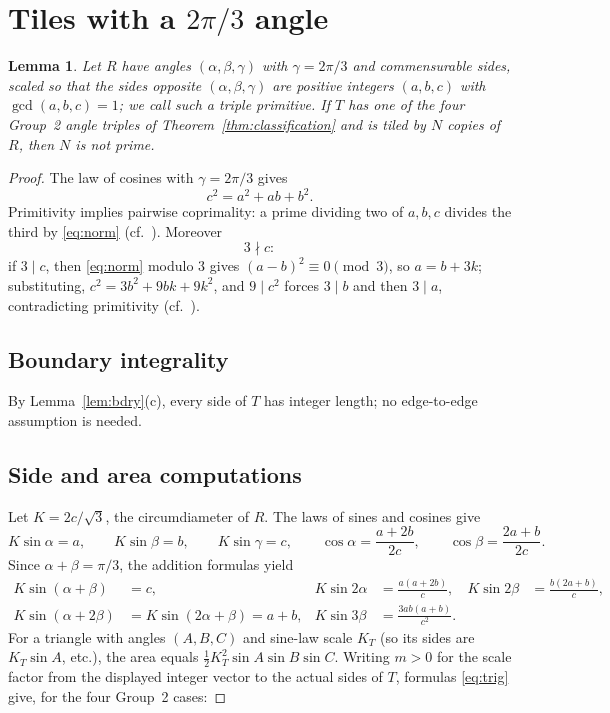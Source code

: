 \documentclass[11pt]{amsart}
\newtheorem{lemma}[theorem]{Lemma}
\theoremstyle{remark}
\begin{document}
\section{Tiles with a \texorpdfstring{$2\pi/3$}{2pi/3} angle}\label{sec:lemma}

\begin{lemma}\label{lem:group2}
Let $R$ have angles $(\alpha,\beta,\gamma)$ with $\gamma=2\pi/3$ and commensurable sides, scaled so that the sides opposite $(\alpha,\beta,\gamma)$ are positive integers $(a,b,c)$ with $\gcd(a,b,c)=1$; we call such a triple \emph{primitive}. If $T$ has one of the four Group~2 angle triples of Theorem~\ref{thm:classification} and is tiled by $N$ copies of $R$, then $N$ is not prime.
\end{lemma}

\begin{proof}
The law of cosines with $\gamma=2\pi/3$ gives
\begin{equation}\label{eq:norm}
c^2=a^2+ab+b^2 .
\end{equation}
Primitivity implies pairwise coprimality: a prime dividing two of $a,b,c$ divides the third by \eqref{eq:norm} (cf.\ \cite[Lemma~13]{BR}). Moreover
\begin{equation}\label{eq:not3}
3\nmid c :
\end{equation}
if $3\mid c$, then \eqref{eq:norm} modulo $3$ gives $(a-b)^2\equiv 0\pmod 3$, so $a=b+3k$; substituting, $c^2=3b^2+9bk+9k^2$, and $9\mid c^2$ forces $3\mid b$ and then $3\mid a$, contradicting primitivity (cf.\ \cite[Lemma~14]{BR}).

\subsection*{Boundary integrality}
By Lemma~\ref{lem:bdry}(c), every side of $T$ has integer length; no edge-to-edge assumption is needed.

\subsection*{Side and area computations}
Let $K=2c/\sqrt 3$, the circumdiameter of $R$. The laws of sines and cosines give
\[
K\sin\alpha=a,\qquad K\sin\beta=b,\qquad K\sin\gamma=c,\qquad
\cos\alpha=\frac{a+2b}{2c},\qquad \cos\beta=\frac{2a+b}{2c}.
\]
Since $\alpha+\beta=\pi/3$, the addition formulas yield
\begin{equation}\label{eq:trig}
\begin{aligned}
K\sin(\alpha+\beta)&=c, &
K\sin 2\alpha&=\frac{a(a+2b)}{c}, &
K\sin 2\beta&=\frac{b(2a+b)}{c},\\
K\sin(\alpha+2\beta)&=K\sin(2\alpha+\beta)=a+b, &
K\sin 3\beta&=\frac{3ab(a+b)}{c^{2}}. &&
\end{aligned}
\end{equation}
For a triangle with angles $(A,B,C)$ and sine-law scale $K_T$ (so its sides are $K_T\sin A$, etc.), the area equals $\tfrac{1}{2}K_T^{2}\sin A\sin B\sin C$. Writing $m>0$ for the scale factor from the displayed integer vector to the actual sides of $T$, formulas \eqref{eq:trig} give, for the four Group~2 cases:


\end{proof}
\end{document}

